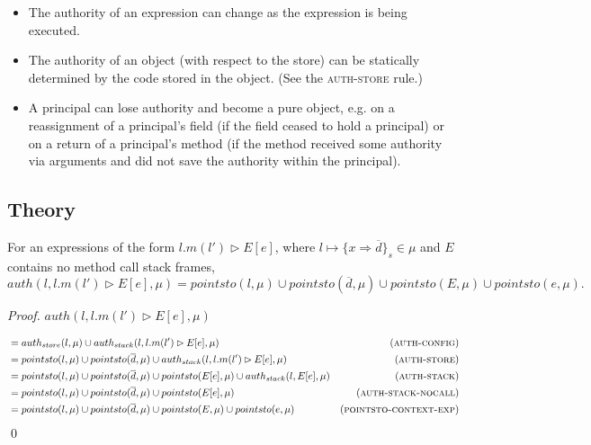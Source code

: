 \documentclass{llncs}
\begin{document}
\begin{itemize}
\item The authority of an expression can change as the expression is being executed.

\item The authority of an object (with respect to the store) can be statically determined by the code stored in the object. (See the \textsc{auth-store} rule.)

\item A principal can lose authority and become a pure object, e.g. on a reassignment of a principal's field (if the field ceased to hold a principal) or on a return of a principal's method (if the method received some authority via arguments and did not save the authority within the principal).

\end{itemize}


\newpage

\subsection{Theory}

\begin{lemma}
For an expressions of the form $l.m(l') \rhd E[e]$, where $l \mapsto \{ x \Rightarrow \overline{d} \}_s \in \mu$ and $E$ contains no method call stack frames,
\[
auth(l, l.m(l') \rhd E[e], \mu) = pointsto(l, \mu) \cup pointsto(\overline{d}, \mu) \cup pointsto(E, \mu) \cup pointsto(e, \mu).
\]
\end{lemma}

\begin{proof} $auth(l, l.m(l') \rhd E[e], \mu)$

\vspace{-17pt}

\begin{align*}
&= auth_{store}(l, \mu) \cup auth_{stack}(l, l.m(l') \rhd E[e], \mu) & (\textsc{auth-config})\\
&= pointsto(l, \mu) \cup pointsto(\overline{d}, \mu) \cup auth_{stack}(l, l.m(l') \rhd E[e], \mu) & (\textsc{auth-store})\\
&= pointsto(l, \mu) \cup pointsto(\overline{d}, \mu) \cup pointsto(E[e], \mu) \cup auth_{stack}(l, E[e], \mu) & (\textsc{auth-stack})\\
&= pointsto(l, \mu) \cup pointsto(\overline{d}, \mu) \cup pointsto(E[e], \mu) & (\textsc{auth-stack-nocall})\\
&= pointsto(l, \mu) \cup pointsto(\overline{d}, \mu) \cup pointsto(E, \mu) \cup pointsto(e, \mu) & (\textsc{pointsto-context-exp})
\end{align*}\qed

\end{proof}
\end{document}
